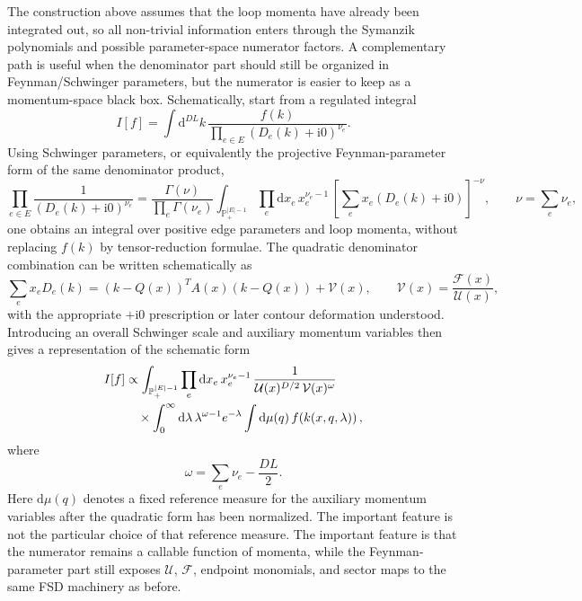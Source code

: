 \documentclass[11pt]{article}
\newcommand{\dd}{\mathrm d}
\newcommand{\ii}{\mathrm i}
\newcommand{\U}{\mathcal U}
\newcommand{\F}{\mathcal F}
\newcommand{\V}{\mathcal V}
\begin{document}
The construction above assumes that the loop momenta have already been
integrated out, so all non-trivial information enters through the Symanzik
polynomials and possible parameter-space numerator factors.  A complementary
path is useful when the denominator part should still be organized in
Feynman/Schwinger parameters, but the numerator is easier to keep as a
momentum-space black box.  Schematically, start from a regulated integral
\begin{equation}
  I[f]
  =
  \int \dd^{DL}k\,
  \frac{f(k)}
       {\prod_{e\in E}(D_e(k)+\ii0)^{\nu_e}} .
\end{equation}
Using Schwinger parameters, or equivalently the projective Feynman-parameter
form of the same denominator product,
\begin{equation}
  \prod_{e\in E}\frac{1}{(D_e(k)+\ii0)^{\nu_e}}
  =
  \frac{\Gamma(\nu)}{\prod_e\Gamma(\nu_e)}
  \int_{\mathbb P^{|E|-1}_+}
  \prod_e \dd x_e\,x_e^{\nu_e-1}\,
  \left[
    \sum_e x_e(D_e(k)+\ii0)
  \right]^{-\nu},
  \qquad
  \nu=\sum_e\nu_e ,
\end{equation}
one obtains an integral over positive edge parameters and loop momenta,
without replacing \(f(k)\) by tensor-reduction formulae.  The quadratic
denominator combination can be written schematically as
\begin{equation}
  \sum_e x_eD_e(k)
  =
  (k-Q(x))^T A(x)(k-Q(x))+\V(x),
  \qquad
  \V(x)=\frac{\F(x)}{\U(x)} ,
\end{equation}
with the appropriate \(+\ii0\) prescription or later contour deformation
understood.  Introducing an overall Schwinger scale and auxiliary momentum
variables then gives a representation of the schematic form
\begin{align}
  I[f]
  &\propto
  \int_{\mathbb P^{|E|-1}_+}
  \prod_e \dd x_e\,x_e^{\nu_e-1}\,
  \frac{1}{\U(x)^{D/2}\,\V(x)^\omega}
  \notag\\
  &\quad\times
  \int_0^\infty \dd\lambda\,
  \lambda^{\omega-1}e^{-\lambda}
  \int \dd\mu(q)\,
  f\!\left(k(x,q,\lambda)\right),
\end{align}
where
\begin{equation}
  \omega=\sum_e\nu_e-\frac{DL}{2}.
\end{equation}
Here \(\dd\mu(q)\) denotes a fixed reference measure for the auxiliary
momentum variables after the quadratic form has been normalized.  The important
feature is not the particular choice of that reference measure.  The important
feature is that the numerator remains a callable function of momenta, while
the Feynman-parameter part still exposes \(\U\), \(\F\), endpoint monomials,
and sector maps to the same FSD machinery as before.
\end{document}
